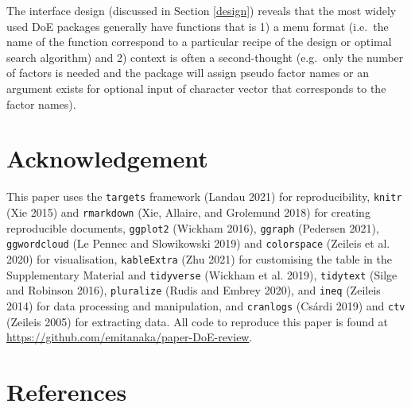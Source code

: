 \documentclass{article}
\begin{document}
The interface design (discussed in Section \ref{design}) reveals that
the most widely used DoE packages generally have functions that is 1) a
menu format (i.e.~the name of the function correspond to a particular
recipe of the design or optimal search algorithm) and 2) context is
often a second-thought (e.g.~only the number of factors is needed and
the package will assign pseudo factor names or an argument exists for
optional input of character vector that corresponds to the factor
names).

\hypertarget{acknowledgement}{%
\section{Acknowledgement}\label{acknowledgement}}

This paper uses the \texttt{targets} framework (Landau 2021) for
reproducibility, \texttt{knitr} (Xie 2015) and \texttt{rmarkdown} (Xie,
Allaire, and Grolemund 2018) for creating reproducible documents,
\texttt{ggplot2} (Wickham 2016), \texttt{ggraph} (Pedersen 2021),
\texttt{ggwordcloud} (Le Pennec and Slowikowski 2019) and
\texttt{colorspace} (Zeileis et al. 2020) for visualisation,
\texttt{kableExtra} (Zhu 2021) for customising the table in the
Supplementary Material and \texttt{tidyverse} (Wickham et al. 2019),
\texttt{tidytext} (Silge and Robinson 2016), \texttt{pluralize} (Rudis
and Embrey 2020), and \texttt{ineq} (Zeileis 2014) for data processing
and manipulation, and \texttt{cranlogs} (Csárdi 2019) and \texttt{ctv}
(Zeileis 2005) for extracting data. All code to reproduce this paper is
found at \url{https://github.com/emitanaka/paper-DoE-review}.

\hypertarget{references}{%
\section*{References}\label{references}}
\end{document}
